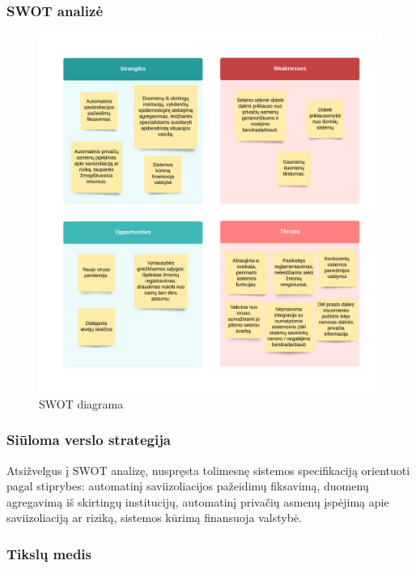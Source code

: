\documentclass{VUMIFPSkursinis}
\begin{document}
\subsubsection{SWOT analizė}\label{sec:versloReqWhySWOT}

\begin{figure}[H]
	\centering
	\includegraphics[scale=0.7]{img/SWOT.png}
	\caption{SWOT diagrama}
	\label{img:swot_diagram}
\end{figure}

\subsubsection{Siūloma verslo strategija}\label{sec:versloReqWhyStrategy}
Atsižvelgus į SWOT analizę, nuspręsta tolimesnę sistemos specifikaciją orientuoti pagal stiprybes: automatinį saviizoliacijos pažeidimų fiksavimą, duomenų agregavimą iš skirtingų institucijų, automatinį privačių asmenų įspėjimą apie saviizoliaciją ar riziką, sistemos kūrimą finansuoja valstybė.
\subsubsection{Tikslų medis}\label{sec:versloReqWhyObjTree}
\end{document}
